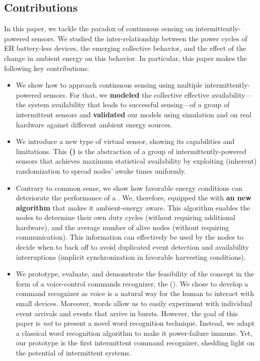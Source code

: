 \subsection{Contributions}
In this paper, we tackle the paradox of continuous sensing on intermittently-powered sensors. 
We studied the inter-relationship between the power cycles of EH battery-less devices, the emerging collective behavior, and the effect of the change in ambient energy on this behavior. In particular, this paper makes the following key contributions:
\begin{itemize}[leftmargin=*]
%
\item We show how to approach continuous sensing using multiple intermittently-powered sensors. 
For that, we \textbf{modeled} the collective effective availability---the system availability that leads to successful sensing---of a group of intermittent sensors and \textbf{validated} our models using simulation and on real hardware against different ambient energy sources. 
%
\item We introduce a new type of virtual sensor, showing its capabilities and limitations. This \textbf{\fullcis (\cis)} is the abstraction of a group of intermittently-powered sensors that achieves maximum statistical availability by exploiting (inherent) randomization to spread nodes' awake times uniformly.
% 
\item Contrary to common sense, we show how favorable energy conditions can deteriorate the performance of a \cis. We, therefore, equipped the \cis with \textbf{an new algorithm} that makes it ambient-energy aware. This algorithm enables the nodes to determine their own duty cycles (without requiring additional hardware), and the average number of alive nodes (without requiring communication). This information can effectively be used by the nodes to decide when to back off to avoid duplicated event detection and availability interruptions (implicit synchronization in favorable harvesting conditions).
%
\item We prototype, evaluate, and demonstrate the feasibility of the \fullcis concept in the form of a voice-control commands recognizer, the \textbf{\fullCIM} (\textbf{\cim}). 
We chose to develop a command recognizer as 
voice is a natural way for the human to interact with small devices. Moreover, words allow us to easily experiment with individual event arrivals and events that arrive in bursts. 
However, the goal of this paper is \emph{not} to present a novel word recognition technique. 
Instead, we adapt a classical word recognition algorithm to make it power-failure immune. Yet, our \cim prototype is the first intermittent command recognizer, shedding light on the potential of intermittent systems. 

\end{itemize}





















